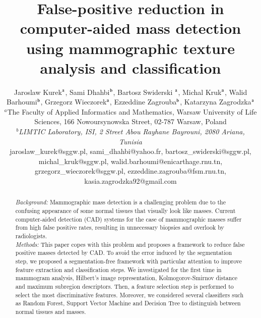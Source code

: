 \documentclass[review,12pt]{elsarticle}
\begin{document}
\thispagestyle{empty}

\begin{frontmatter}
\title{False-positive reduction in computer-aided mass detection using mammographic texture analysis and classification}

\author{Jaroslaw Kurek$^{\rm a}$, Sami Dhahbi$^{\rm b}$, Bartosz Swiderski $^{\rm a}$,  Michal Kruk$^{\rm a}$, Walid Barhoumi$^{\rm b}$, Grzegorz Wieczorek$^{\rm a}$, Ezzeddine Zagrouba$^{\rm b}$, Katarzyna Zagrodzka$^{\rm a}$ \\
 $^{a}$The Faculty of Applied Informatics and Mathematics, Warsaw University of Life Sciences, 166 Nowoursynowska Street, 02-787 Warsaw, Poland \\%
 $^{b}${\em{LIMTIC Laboratory, ISI, 2 Street Abou Rayhane Bayrouni, 2080 Ariana, Tunisia}}\\
jaroslaw{\_}kurek@sggw.pl, sami{\_}dhahbi@yahoo.fr, bartosz{\_}swiderski@sggw.pl,  michal{\_}kruk@sggw.pl, walid.barhoumi@enicarthage.rnu.tn, grzegorz{\_}wieczorek@sggw.pl, ezzeddine.zagrouba@fsm.rnu.tn, kasia.zagrodzka92@gmail.com
}
\begin{abstract}
\textit{Background: } Mammographic mass detection is a challenging problem due to the confusing appearance of some normal tissues that visually look like masses. Current computer-aided detection (CAD) systems for the case of mammographic masses suffer from high false positive rates, resulting in unnecessary biopsies and overlook by radiologists.\\
\textit{Methods:} This paper copes with this problem and proposes a framework to reduce false positive masses detected by CAD. 
  To avoid the error induced by the segmentation step, we proposed a segmentation-free framework with particular attention to improve feature extraction and classification steps.
We investigated for the first time in mammogram analysis, Hilbert's image representation, Kolmogorov-Smirnov distance and maximum subregion descriptors.
  Then, a feature selection step is performed to select the most discriminative features. Moreover, we considered several classifiers such as Random Forest, Support Vector Machine and Decision Tree to distinguish between normal tissues and masses.\\

\end{abstract}
\end{frontmatter}
\end{document}

